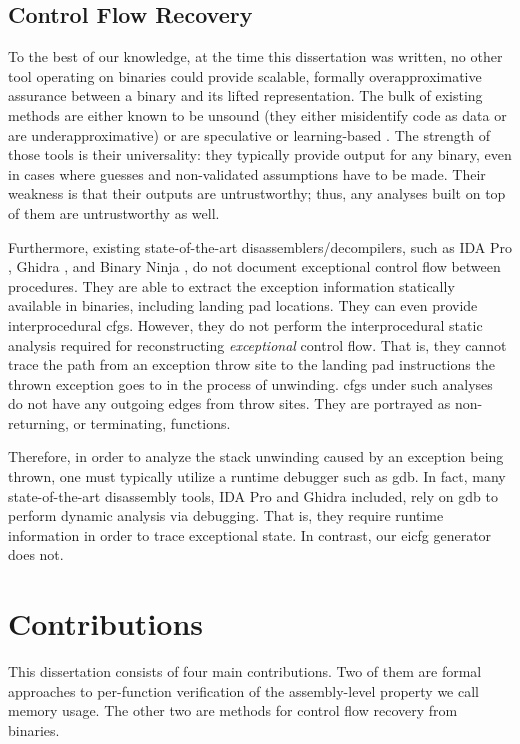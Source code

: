 \subsection{Control Flow Recovery}
To the best of our knowledge, at the time this dissertation was written, no other tool operating on binaries could provide scalable, formally overapproximative assurance between a binary and its lifted representation.
The bulk of existing methods are either known to be unsound (they either  misidentify code as data or are underapproximative) \autocite{schwartz2002disassembly} or are speculative or learning-based \autocite{wartell2011differentiating,khadra2016speculative}.
The strength of those tools is their universality: they typically provide output for any binary, even in cases where guesses and non-validated assumptions have to be made.
Their weakness is that their outputs are untrustworthy; thus, any analyses built on top of them are untrustworthy as well.

Furthermore, existing state-of-the-art disassemblers/decompilers, such as IDA Pro \autocite{ida}, Ghidra \autocite{ghidra}, and Binary Ninja \autocite{binary-ninja}, do not document exceptional control flow between procedures.
They are able to extract the exception information statically available in binaries, including landing pad locations.
They can even provide interprocedural \acp{cfg}.
However, they do not perform the interprocedural static analysis required for reconstructing \emph{exceptional} control flow.
That is, they cannot trace the path from an exception throw site to the landing pad instructions the thrown exception goes to in the process of unwinding.
\Acp{cfg} under such analyses do not have any outgoing edges from throw sites.
They are portrayed as non-returning, or terminating, functions.

Therefore, in order to analyze the stack unwinding caused by an exception being thrown, one must typically utilize a runtime debugger such as \ac{gdb}.
In fact, many state-of-the-art disassembly tools, IDA Pro and Ghidra included,
rely on \ac{gdb} to perform dynamic analysis via debugging.
That is, they require runtime information in order to trace exceptional state.
In contrast, our \ac{eicfg} generator does not.

\section{Contributions}
This dissertation consists of four main contributions.
Two of them are formal approaches to per-function verification of the assembly-level property we call memory usage.
The other two are methods for control flow recovery from binaries.

